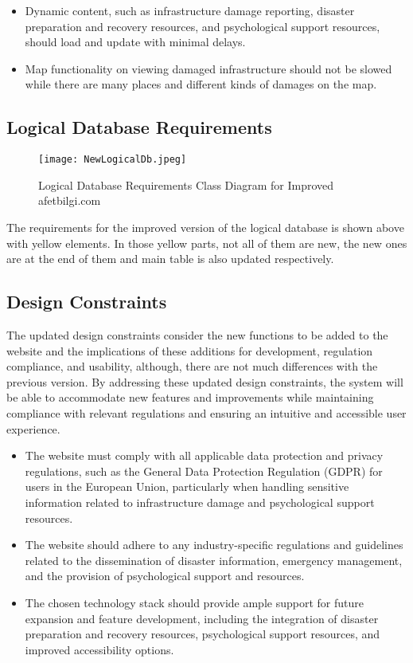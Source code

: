 \documentclass[11pt,a4paper]{article}
\begin{document}
\begin{itemize}
    \item Dynamic content, such as infrastructure damage reporting, disaster preparation and recovery resources, and psychological support resources, should load and update with minimal delays.
    \item Map functionality on viewing damaged infrastructure should not be slowed while there are many places and different kinds of damages on the map.
\end{itemize}

\newpage

\subsection{Logical Database Requirements}

\begin{figure}[H]
    \centering
    \texttt{[image: NewLogicalDb.jpeg]}
    \caption{Logical Database Requirements Class Diagram for Improved afetbilgi.com}
    \label{Logical Database Requirements Class Diagram for Improved afetbilgi.com}
\end{figure}

The requirements for the improved version of the logical database is shown above with yellow elements. In those yellow parts, not all of them are new, the new ones are at the end of them and main table is also updated respectively.

\newpage    

\subsection{Design Constraints}
The updated design constraints consider the new functions to be added to the website and the implications of these additions for development, regulation compliance, and usability, although, there are not much differences with the previous version. By addressing these updated design constraints, the system will be able to accommodate new features and improvements while maintaining compliance with relevant regulations and ensuring an intuitive and accessible user experience.

\begin{itemize}
    \item The website must comply with all applicable data protection and privacy regulations, such as the General Data Protection Regulation (GDPR) for users in the European Union, particularly when handling sensitive information related to infrastructure damage and psychological support resources.
    \item The website should adhere to any industry-specific regulations and guidelines related to the dissemination of disaster information, emergency management, and the provision of psychological support and resources.
    \item The chosen technology stack should provide ample support for future expansion and feature development, including the integration of disaster preparation and recovery resources, psychological support resources, and improved accessibility options.
\end{itemize}
\end{document}
